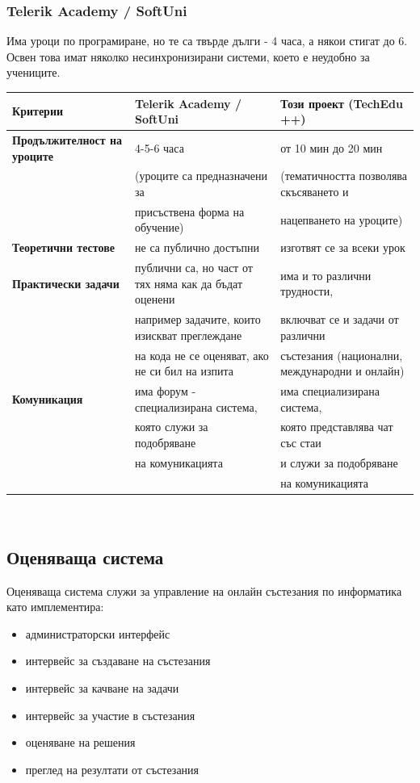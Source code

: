 \documentclass[12pt]{article}
\begin{document}
	\subsubsection{Telerik Academy / SoftUni}
	Има уроци по програмиране, но те са твърде дълги - 4 часа, а някои стигат до 6. Освен това имат няколко несинхронизирани системи, което е неудобно за учениците.
	\begin{table}[ht]
	\centering
	\resizebox{\textwidth}{!}
	{
		\begin{tabular}{l|l|l}
			\bf{Критерии} & \bf{Telerik Academy / SoftUni} & \bf{Този проект (TechEdu ++)}\\
			\hline
			\bf{Продължителност на уроците} & 4-5-6 часа & от 10 мин до 20 мин\\
			&(уроците са предназначени за&(тематичността позволява скъсяването и \\
			&присъствена форма на обучение)& нацепването на уроците)\\
			\hline
			\bf{Теоретични тестове} & не са публично достъпни & изготвят се за всеки урок\\
			\hline
			\bf{Практически задачи} & публични са, но част от тях няма как да бъдат оценени & има и то различни трудности,\\
			& например задачите, които изискват преглеждане& включват се и задачи от различни \\
			& на кода не се оценяват, ако не си бил на изпита & състезания (национални, международни и онлайн)\\
			\hline
			\bf{Комуникация} & има форум - специализирана система, & има специализирана система,\\
			&която служи за подобряване& която представлява чат със стаи \\
			&на комуникацията & и служи за подобряване\\
			& & на комуникацията\\
			\hline
		\end{tabular}
	}
	\end{table}\\
	\subsection{Оценяваща система}
	Оценяваща система служи за управление на онлайн състезания по информатика като имплементира:
	\begin{itemize}
	  \item администраторски интерфейс
	  \item интервейс за създаване на състезания
	  \item интервейс за качване на задачи
	  \item интервейс за участие в състезания
	  \item оценяване на решения
	  \item преглед на резултати от състезания
	\end{itemize}
\end{document}
